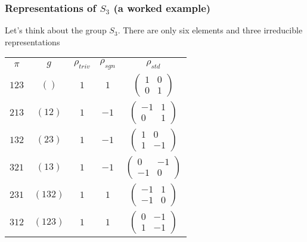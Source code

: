 \documentclass{beamer} %
\theoremstyle{definition} %
\begin{document}
	\begin{frame}
		\frametitle{Representations of $S_3$ (a worked example)}
		
		
		
		
		
		Let's think about the group $S_3$.  There are only six elements and three irreducible representations
		
		\pause
		
	\begin{center}
			\begin{tabular}{c<{\onslide<3->}c<{\onslide<4->}c<{\onslide<5->}c<{\onslide<6->}c<{\onslide<2->}}
				$\pi$ & $g$ &           $\rho_{triv}$ 	& $\rho_{sgn}$ 		& $\rho_{std}$ 			\\
				$123$   & $()$   & $1$ 			& $1$      			& $\begin{pmatrix} 1 & 0  \\ 0 & 1 \end{pmatrix} $ \\
				$213$   & $(12)$   	& $1$ 			& $-1$      		& $\begin{pmatrix} -1 & 1  \\ 0 & 1 \end{pmatrix} $     		\\
				$132$   & $(23)$   	& $1$ 			& $-1$      		& $\begin{pmatrix} 1 & 0  \\ 1 & -1 \end{pmatrix} $    												\\
				$321$   & $(13)$   		& $1$ 			& $-1$      		& $\begin{pmatrix} 0 & -1  \\ -1 & 0 \end{pmatrix} $     \\			
				$231$   & $(132)$   	& $1$ 			& $1$      			&$\begin{pmatrix} -1 & 1  \\ -1 & 0 \end{pmatrix} $     		\\
				$312$   & $(123)$   	& $1$ 			& $1$      			& $\begin{pmatrix} 0 & -1  \\ 1 & -1 \end{pmatrix} $     		
			
			\end{tabular}

		\end{center}		
		
		
	\end{frame}
\end{document}
